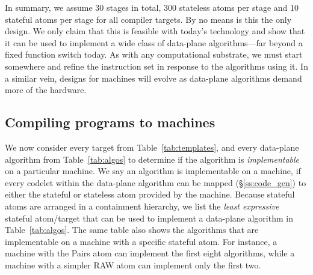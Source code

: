In summary, we assume 30 stages in total, 300 stateless atoms per stage and 10
stateful atoms per stage for all compiler targets. By no means is this the only
design. We only claim that this is feasible with today's technology and show
that it can be used to implement a wide class of data-plane algorithms---far
beyond a fixed function switch today. As with any computational substrate, we
must start somewhere and refine the instruction set in response to the
algorithms using it.  In a similar vein, designs for \absmachine machines will
evolve as data-plane algorithms demand more of the hardware.



\subsection{Compiling \pktlanguage programs to \absmachine machines}
\label{ss:compiler}
We now consider every target from Table~\ref{tab:templates}, and every
data-plane algorithm from Table~\ref{tab:algos} to determine if the algorithm
is \textit{implementable} on a particular \absmachine machine. We say an
algorithm is implementable on a \absmachine machine, if every codelet within
the data-plane algorithm can be mapped (\S\ref{ss:code_gen}) to either the
stateful or stateless atom provided by the \absmachine machine. Because
stateful atoms are arranged in a containment hierarchy, we list the
\textit{least expressive} stateful atom/target that can be used to implement a
data-plane algorithm in Table~\ref{tab:algos}. The same table also shows the
algorithms that are implementable on a \absmachine machine with a specific
stateful atom. For instance, a \absmachine machine with the Pairs atom can
implement the first eight algorithms, while a machine with a simpler RAW atom
can implement only the first two.

